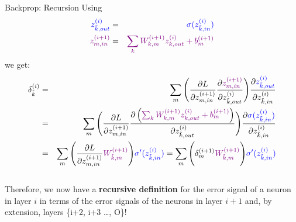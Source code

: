 \begin{frame} {Backprop: Recursion}
 Using 
 \vspace*{-5mm}
        {\footnotesize \begin{eqnarray*}
          \textcolor{blue}{z_{\tilde{k},out}^{(i)}} &=& \textcolor{blue}{\sigma(z_{\tilde{k},in}^{(i)})} \\
          \textcolor{violet}{z_{m,in}^{(i+1)}} &=& \textcolor{violet}{\sum_k W_{k,m}^{(i+1)}z_{k,out}^{(i)} + b_m^{(i+1)}}
        \end{eqnarray*}}
we get: 
      \vspace{-0.2cm}
      {\footnotesize \begin{eqnarray*}
      \delta_{\tilde{k}}^{(i)} &=& \sum_m \Bigg( \frac{\partial L}{\partial z_{m,in}^{(i+1)}} \frac{\partial \textcolor{violet}{z_{m,in}^{(i+1)}}}{\partial z_{\tilde{k},out}^{(i)}} \Bigg) \frac{\partial \textcolor{blue}{z_{\tilde{k},out}^{(i)}}}{\partial z_{\tilde{k},in}^{(i)}}  \\
       &=& \sum_m \Bigg( \frac{\partial L}{\partial z_{m,in}^{(i+1)}} \frac{\partial \left(\textcolor{violet}{\sum_k W_{k,m}^{(i+1)}z_{k,out}^{(i)} + b_m^{(i+1)}}\right)}{\partial z_{\tilde{k},out}^{(i)}} \Bigg) \frac{\partial \textcolor{blue}{\sigma(z_{\tilde{k},in}^{(i)})}}{\partial z_{\tilde{k},in}^{(i)}}  \\
      &=& \sum_m \Bigg( \frac{\partial L}{\partial z_{m,in}^{(i+1)}} \textcolor{violet}{W_{\tilde{k},m}^{(i+1)}} \Bigg) \textcolor{blue}{\sigma'(z_{\tilde{k},in}^{(i)})} = \sum_m \Bigg(  \delta_{m}^{(i+1)} \textcolor{violet}{W_{\tilde{k},m}^{(i+1)}} \Bigg) \textcolor{blue}{\sigma'(z_{\tilde{k},in}^{(i)})} 
      \end{eqnarray*}}\\
      Therefore, we now have a \textbf{recursive definition} for the error signal of a neuron in layer $i$ in terms of the error signals of the neurons in layer $i+1$ and, by extension, layers \{i+2, i+3 \ldots , O\}!
\end{frame}

